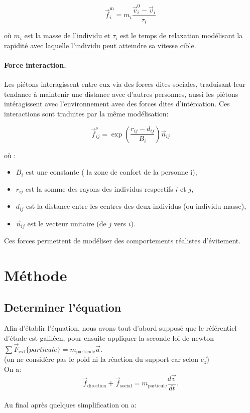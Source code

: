 \documentclass[a4paper,12pt]{article}
\begin{document}
\begin{equation}
\label{eq:force_motrice}
\vec{f}_i^{\text{m}} = m_i \frac{\vec{v}_i^0 - \vec{v}_i}{\tau_i}
\end{equation}

où $m_i$ est la masse de l'individu et $\tau_i$ est le temps de relaxation modélisant la rapidité avec laquelle l'individu peut atteindre sa vitesse cible.

\paragraph{Force interaction.}
Les piétons interagissent entre eux via des forces dites sociales, traduisant leur tendance à maintenir une distance avec d'autres personnes, aussi les piètons intéragissent avec l'environnement avec des forces dites d'intércation. Ces interactions sont traduites par la même modélisation:

\begin{equation}
\label{eq:force_sociale}
\vec{f}_{ij}^{\text{s}} = \exp\left(\frac{r_{ij} - d_{ij}}{B_i}\right) \vec{n}_{ij}
\end{equation}

où :
\begin{itemize}
  \item  $B_i$ est une constante ( la zone de confort de la personne i),
  \item $r_{ij}$ est la somme des rayons des individus respectifs $i$ et $j$,
  \item $d_{ij}$ est la distance entre les centres des deux individus (ou individu masse),
  \item $\vec{n}_{ij}$ est le vecteur unitaire (de $j$ vers $i$).
\end{itemize}

Ces forces permettent de modéliser des comportements réalistes d’évitement.


\section{Méthode}

\subsection{Determiner l'équation}

\indent Afin d’établir l’équation, nous avons tout d’abord supposé que le référentiel d’étude est galiléen, pour ensuite appliquer la seconde loi de newton $\sum \vec{F}_{\text{ext}} \{particule\} = m_{\text{particule}} \vec{a}$.
\\(on ne considère pas le poid ni la réaction du support car selon $\vec{e_z}$)
\\ On a:
\[
\vec{f}_{\text{direction}} + \vec{f}_{\text{social}} = m_{\text{particule}} \frac{d\vec{v}}{dt}.
\]
\\ Au final après quelques simplification on a:
\end{document}
